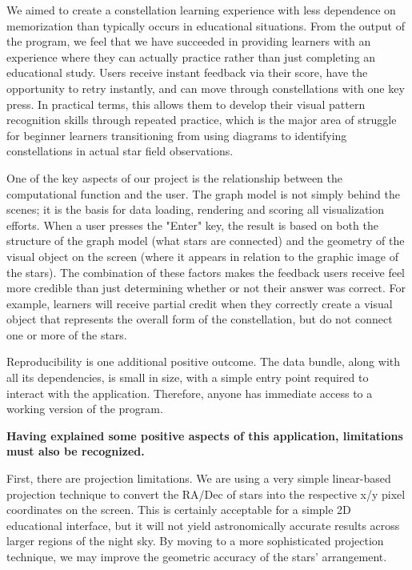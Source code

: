 \documentclass[11pt]{article}
\begin{document}
We aimed to create a constellation learning experience with less dependence on memorization than typically occurs in educational situations. From the output of the program, we feel that we have succeeded in providing learners with an experience where they can actually practice rather than just completing an educational study. Users receive instant feedback via their score, have the opportunity to retry instantly, and can move through constellations with one key press. In practical terms, this allows them to develop their visual pattern recognition skills through repeated practice, which is the major area of struggle for beginner learners transitioning from using diagrams to identifying constellations in actual star field observations.

One of the key aspects of our project is the relationship between the computational function and the user. The graph model is not simply behind the scenes; it is the basis for data loading, rendering and scoring all visualization efforts. When a user presses the "Enter" key, the result is based on both the structure of the graph model (what stars are connected) and the geometry of the visual object on the screen (where it appears in relation to the graphic image of the stars). The combination of these factors makes the feedback users receive feel more credible than just determining whether or not their answer was correct. For example, learners will receive partial credit when they correctly create a visual object that represents the overall form of the constellation, but do not connect one or more of the stars.

Reproducibility is one additional positive outcome. The data bundle, along with all its dependencies, is small in size, with a simple entry point required to interact with the application. Therefore, anyone has immediate access to a working version of the program.

\textbf{Having explained some positive aspects of this application, limitations must also be recognized.}

First, there are projection limitations. We are using a very simple linear-based projection technique to convert the RA/Dec of stars into the respective x/y pixel coordinates on the screen. This is certainly acceptable for a simple 2D educational interface, but it will not yield astronomically accurate results across larger regions of the night sky. By moving to a more sophisticated projection technique, we may improve the geometric accuracy of the stars' arrangement.
\end{document}
